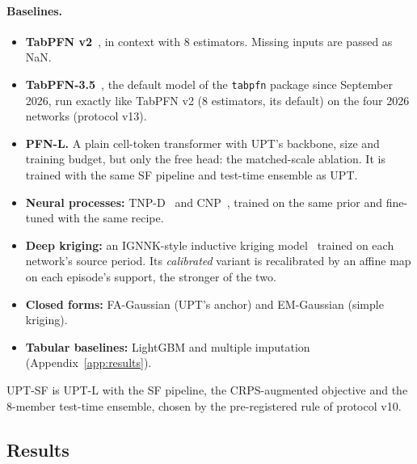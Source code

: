\paragraph{Baselines.}
\begin{itemize}
  \item \textbf{TabPFN v2}~\citep{hollmann2025tabpfnv2}, in context with 8 estimators. Missing inputs are passed as
  NaN.
  \item \textbf{TabPFN-3.5}~\citep{jaeger2026tabpfn35}, the default model of the \texttt{tabpfn} package since
  September 2026, run exactly like TabPFN v2 (8 estimators, its default) on the four 2026 networks (protocol v13).
  \item \textbf{PFN-L.} A plain cell-token transformer with UPT's backbone, size and training budget, but only the
  free head: the matched-scale ablation. It is trained with the same SF pipeline and test-time ensemble as UPT.
  \item \textbf{Neural processes:} TNP-D~\citep{nguyen2022tnp} and CNP~\citep{garnelo2018cnp}, trained on the same
  prior and fine-tuned with the same recipe.
  \item \textbf{Deep kriging:} an IGNNK-style inductive kriging model~\citep{wu2021ignnk} trained on each network's
  source period. Its \emph{calibrated} variant is recalibrated by an affine map on each episode's support, the
  stronger of the two.
  \item \textbf{Closed forms:} FA-Gaussian (UPT's anchor) and EM-Gaussian (simple kriging).
  \item \textbf{Tabular baselines:} LightGBM and multiple imputation (Appendix~\ref{app:results}).
\end{itemize}
UPT-SF is UPT-L with the SF pipeline, the CRPS-augmented objective and the 8-member test-time ensemble, chosen by the
pre-registered rule of protocol v10.

\subsection{Results}
\label{sec:results}


